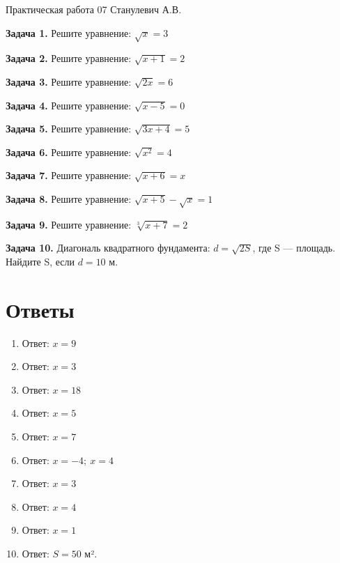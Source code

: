 \documentclass{umk-matematika}
\begin{document}
\maketitlepage
    {Практическая работа 07}
    {}
    {Станулевич А.В.}

\textbf{Задача 1.} Решите уравнение: $\sqrt{x} = 3$\par\vspace{10pt}
\textbf{Задача 2.} Решите уравнение: $\sqrt{x + 1} = 2$\par\vspace{10pt}
\textbf{Задача 3.} Решите уравнение: $\sqrt{2x} = 6$\par\vspace{10pt}
\textbf{Задача 4.} Решите уравнение: $\sqrt{x - 5} = 0$\par\vspace{10pt}
\textbf{Задача 5.} Решите уравнение: $\sqrt{3x + 4} = 5$\par\vspace{10pt}
\textbf{Задача 6.} Решите уравнение: $\sqrt{x^2} = 4$\par\vspace{10pt}
\textbf{Задача 7.} Решите уравнение: $\sqrt{x + 6} = x$\par\vspace{10pt}
\textbf{Задача 8.} Решите уравнение: $\sqrt{x + 5} - \sqrt{x} = 1$\par\vspace{10pt}
\textbf{Задача 9.} Решите уравнение: $\sqrt[3]{x + 7} = 2$\par\vspace{10pt}
\textbf{Задача 10.} Диагональ квадратного фундамента: $d = \sqrt{2S}$, где S — площадь. Найдите S, если $d = 10$ м.\par\vspace{10pt}
\newpage
\section*{Ответы}

\begin{enumerate}
  \item Ответ: $x = 9$
  \item Ответ: $x = 3$
  \item Ответ: $x = 18$
  \item Ответ: $x = 5$
  \item Ответ: $x = 7$
  \item Ответ: $x = -4;\ x = 4$
  \item Ответ: $x = 3$
  \item Ответ: $x = 4$
  \item Ответ: $x = 1$
  \item Ответ: $S = 50$ м².
\end{enumerate}
\end{document}
